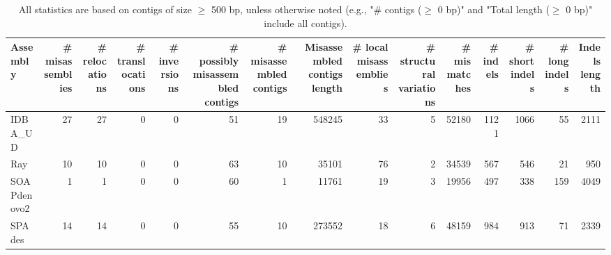 \documentclass[12pt,a4paper]{article}
\begin{document}
\begin{table}[ht]
\begin{center}
\caption{All statistics are based on contigs of size $\geq$ 500 bp, unless otherwise noted (e.g., "\# contigs ($\geq$ 0 bp)" and "Total length ($\geq$ 0 bp)" include all contigs).}
\begin{tabular}{|l*{14}{|r}|}
\hline
Assembly & \# misassemblies &     \# relocations &     \# translocations &     \# inversions & \# possibly misassembled contigs & \# misassembled contigs & Misassembled contigs length & \# local misassemblies & \# structural variations & \# mismatches & \# indels &     \# short indels &     \# long indels & Indels length \\ \hline
IDBA\_UD & 27 & 27 & 0 & 0 & 51 & 19 & 548245 & 33 & 5 & 52180 & 1121 & 1066 & 55 & 2111 \\ \hline
Ray & 10 & 10 & 0 & 0 & 63 & 10 & 35101 & 76 & 2 & 34539 & 567 & 546 & 21 & 950 \\ \hline
SOAPdenovo2 & 1 & 1 & 0 & 0 & 60 & 1 & 11761 & 19 & 3 & 19956 & 497 & 338 & 159 & 4049 \\ \hline
SPAdes & 14 & 14 & 0 & 0 & 55 & 10 & 273552 & 18 & 6 & 48159 & 984 & 913 & 71 & 2339 \\ \hline
\end{tabular}
\end{center}
\end{table}
\end{document}
